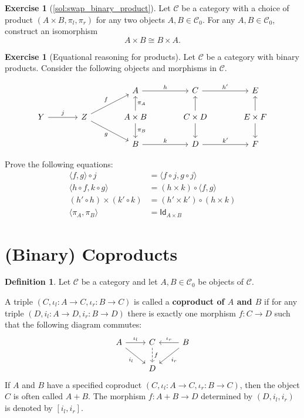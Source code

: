 \documentclass[a4paper,11pt, oneside,titlepage=false]{scrbook}
\theoremstyle{plain}
\theoremstyle{definition}
\newtheorem{dfn}[thm]{Definition}
\newtheorem{exer}[thm]{Exercise}
\newcommand{\cfont}[1]{\ensuremath{\mathsf{#1}}}
\newcommand{\Cat}[1]{\mathcal{#1}}
\newcommand{\CC}{\Cat{C}}
\newcommand{\Ob}[1]{{#1}_0}
\newcommand{\Id}[1][]{\cfont{Id}_{#1}}
\newcommand{\inl}{\ensuremath{\iota_l}}
\newcommand{\inr}{\ensuremath{\iota_r}}
\newcommand{\projl}{\ensuremath{\pi_l}}
\newcommand{\projr}{\ensuremath{\pi_r}}
\newcommand{\intoproduct}[2]{\ensuremath{\langle #1, #2 \rangle}}
\newcommand{\outofcoproduct}[2]{\ensuremath{[ #1, #2 ]}}
\newcommand{\productmap}[2]{\ensuremath{ #1 \times #2 }}
\newcommand{\co}[2]{\ensuremath{#2 \circ #1}}
\begin{document}
\begin{exer}[\cref{sol:swap_binary_product}]\label{exer:swap_binary_product}
  Let $\CC$ be a category with a choice of product $(A\times B, \projl, \projr)$ for any two objects $A,B\in \Ob{\CC}$.
  For any $A, B \in \Ob\CC$, construct an isomorphism
  \[ A \times B \cong B \times A. \]
\end{exer}

\begin{exer}[Equational reasoning for products]
  Let $\CC$ be a category with binary products.
  Consider the following objects and morphisms in $\CC$.

  \[
    \begin{tikzcd}[column sep=large]
      &
      &
      A \ar[r, "h"]
      &
      C \ar[r, "h'"]
      &
      E
      \\
      Y \ar[r, "j"]
      &
      Z \ar[ru, "f"] \ar[rd, "g"'] %
      &
      A\times B \ar[u, "\pi_A"'] \ar[d, "\pi_B"]
      &
      C \times D  \ar[u] \ar[d]
      &
      E \times F  \ar[u] \ar[d]
      \\
      &
      &
      B \ar[r,"k"]
      &
      D \ar[r,"k'"]
      &
      F
    \end{tikzcd}
  \]
  
  Prove the following equations:
  \begin{align}
    \co{j}{\intoproduct{f}{g}} &= \intoproduct{\co j f}{\co j g}
    \\
    \intoproduct{\co f h}{\co g k} &= \co {\intoproduct f g} {(\productmap h k)} 
    \\
    \productmap{(\co h {h'})}{(\co k {k'})} &= \co {(\productmap h k)}{(\productmap {h'} {k'})} 
    \\
    \intoproduct{\pi_A}{\pi_B} &= \Id[A \times B]
  \end{align}
\end{exer}


\section{(Binary) Coproducts}
\label{sec:coproducts}

\begin{dfn}
   Let $\CC$ be a category and let $A,B \in \Ob\CC$ be objects of $\CC$.

  A triple $(C,\inl : A \to C,\inr : B \to C)$ is called a \textbf{coproduct of $A$ and $B$} if for any triple $(D,i_l : A \to D, i_r : B \to D)$ there is exactly one morphism $f : C \to D$ such that the following diagram commutes:
  \[
    \begin{tikzcd}
      A \ar[r, "\inl"] \ar[rd, "i_l"']
      &
      C  \ar[d, dashed, "f"]
      &
      B \ar[l, "\inr"'] \ar[ld, "i_r"]
      \\
      &
      D %
    \end{tikzcd}
  \]
  If $A$ and $B$ have a specified coproduct $(C,\inl : A \to C,\inr : B \to C)$, then the object $C$ is often called $A + B$.
  The morphism $f : A + B \to D$ determined by $(D, i_l, i_r)$ is denoted by $\outofcoproduct{i_l}{i_r}$.
  
\end{dfn}
\end{document}
